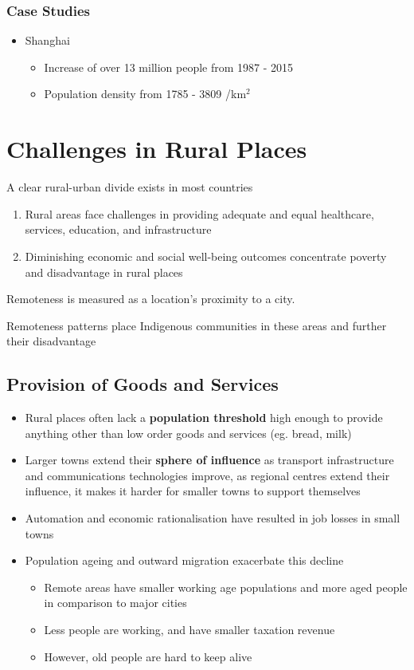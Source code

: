 		\subsubsection{Case Studies}
			\begin{itemize}
				\item Shanghai
				\begin{itemize}
					\item Increase of over 13 million people from 1987 - 2015
					\item Population density from 1785 - 3809 /km$^2$
				\end{itemize}
			\end{itemize}

\section{Challenges in Rural Places} \label{04/03/2025}

	A clear rural-urban divide exists in most countries

	\begin{enumerate}
		\item Rural areas face challenges in providing adequate and equal healthcare, services, education, and infrastructure
		\item Diminishing economic and social well-being outcomes concentrate poverty and disadvantage in rural places
	\end{enumerate}
	
	Remoteness is measured as a location's proximity to a city.

	Remoteness patterns place Indigenous communities in these areas and further their disadvantage

	\subsection{Provision of Goods and Services}
	
		\begin{itemize}
			\item Rural places often lack a \textbf{population threshold} high enough to provide anything other than low order goods and services (eg. bread, milk)
			\item Larger towns extend their \textbf{sphere of influence} as transport infrastructure and communications technologies improve, as regional centres extend their influence, it makes it harder for smaller towns to support themselves
			\item Automation and economic rationalisation have resulted in job losses in small towns
			\item Population ageing and outward migration exacerbate this decline
				\begin{itemize}
					\item Remote areas have smaller working age populations and more aged people in comparison to major cities
					\item Less people are working, and have smaller taxation revenue
					\item However, old people are hard to keep alive
				\end{itemize}
		\end{itemize}

